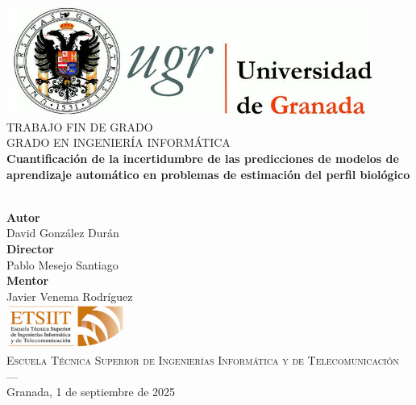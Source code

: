\begin{titlepage}
\thispagestyle{empty}

\begin{center}
\includegraphics[width=0.9\textwidth]{portada/imagenes/logo_ugr.jpg}\\[1.4cm]

\textsc{ \Large TRABAJO FIN DE GRADO\\[0.2cm]}
\textsc{ GRADO EN INGENIERÍA INFORMÁTICA}\\[1cm]

{\LARGE \bfseries Cuantificación de la incertidumbre de las predicciones de modelos de aprendizaje automático en problemas de estimación del perfil biológico\\}
\noindent\\[3.5ex]
\end{center}

\vspace{0.5cm}

\begin{center}
\textbf{Autor}\\ {David González Durán}\\[2.5ex]
\textbf{Director}\\ {Pablo Mesejo Santiago}\\[2.5ex]
\textbf{Mentor}\\{Javier Venema Rodríguez}\\[2cm]
\includegraphics[width=0.3\textwidth]{portada/imagenes/etsiit_logo.png}\\[0.1cm]
\textsc{Escuela Técnica Superior de Ingenierías Informática y de Telecomunicación}\\
\textsc{---}\\
Granada, 1 de septiembre de 2025
\end{center}

\end{titlepage}
